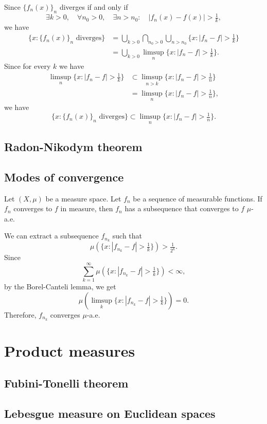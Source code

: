 \documentclass{../note}
\begin{document}
Since $\{f_n(x)\}_n$ diverges if and only if
\[\exists k>0,\quad\forall n_0>0,\quad\exists n>n_0:\quad|f_n(x)-f(x)|>\tfrac1k,\]
we have
\begin{align*}
\{x:\{f_n(x)\}_n\text{ diverges}\}
&=\bigcup_{k>0}\bigcap_{n_0>0}\bigcup_{n>n_0}\{x:|f_n-f|>\tfrac1k\}\\
&=\bigcup_{k>0}\limsup_n\{x:|f_n-f|>\tfrac1k\}.
\end{align*}
Since for every $k$ we have
\begin{align*}
\limsup_n\{x:|f_n-f|>\tfrac1k\}
&\subset\limsup_{n>k}\{x:|f_n-f|>\tfrac1n\}\\
&=\limsup_n\{x:|f_n-f|>\tfrac1n\},
\end{align*}
we have
\[\{x:\{f_n(x)\}_n\text{ diverges}\}\subset\limsup_n\{x:|f_n-f|>\tfrac1n\}.\]



\section{Radon-Nikodym theorem}


\section{Modes of convergence}

\begin{prb}
Let $(X,\mu)$ be a measure space.
Let $f_n$ be a sequence of measurable functions.
If $f_n$ converges to $f$ in measure, then $f_n$ has a subsequence that converges to $f$ $\mu$-a.e.
\end{prb}
\begin{pf}
We can extract a subsequence $f_{n_k}$ such that
\[\mu(\{x:|f_{n_k}-f|>\tfrac1k\})>\tfrac1{2^k}.\]
Since
\[\sum_{k=1}^\infty\mu(\{x:|f_{n_k}-f|>\tfrac1k\})<\infty,\]
by the Borel-Canteli lemma, we get
\[\mu(\limsup_k\{x:|f_{n_k}-f|>\tfrac1k\})=0.\]
Therefore, $f_{n_k}$ converges $\mu$-a.e.
\end{pf}




\chapter{Product measures}
\section{Fubini-Tonelli theorem}
\section{Lebesgue measure on Euclidean spaces}
\end{document}
